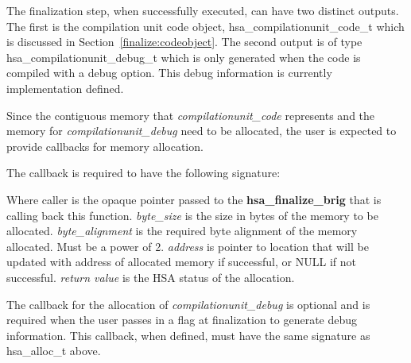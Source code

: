 \documentclass{book}
\newcommand{\reffun}[1]{\textbf{#1}}
\newcommand{\reftyp}[1]{#1}
\begin{document}
\begin{appendices}
The finalization step, when successfully executed, can have two
distinct outputs. The first is the compilation unit code object,
\reftyp{hsa\_compilationunit\_code\_t} which is discussed in
Section~\ref{finalize:codeobject}. The second output is of type
\reftyp{hsa\_compilationunit\_debug\_t} which is only generated when
the code is  compiled with a debug option. This debug information is
currently implementation defined.

Since the contiguous memory that {\itshape
compilationunit\_code} represents and the memory for {\itshape
compilationunit\_debug} need to be allocated, the user is expected
to provide callbacks for memory allocation.

The callback is required to have the following signature:
\makeatletter{} 

Where caller is the opaque pointer passed to the
\reffun{hsa\_finalize\_brig} that is calling back this function.
{\itshape byte\_size} is the size in bytes of the memory to be
allocated.  {\itshape byte\_alignment} is the required byte alignment
of the memory allocated. Must be a power of 2.  {\itshape address} is
pointer to location that will be updated with address of allocated
memory if successful, or NULL if not successful.  {\itshape return
  value} is the HSA status of the allocation.

The callback for the allocation of {\itshape compilationunit\_debug}
is optional and is required when the user passes in a flag at
finalization to generate debug information. This callback, when
defined, must have the same signature as \reftyp{hsa\_alloc\_t} above.

\makeatletter{}


\end{appendices}
\end{document}

